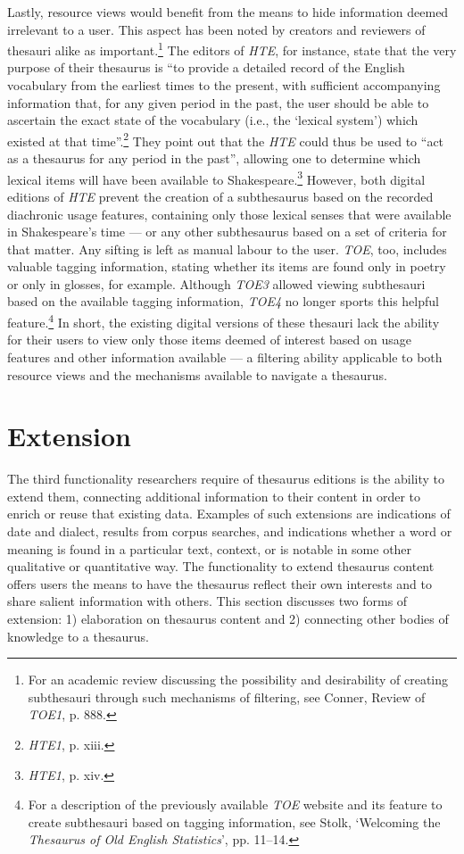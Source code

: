 Lastly, resource views would benefit from the means to hide information deemed irrelevant to a user. This aspect has been noted by creators and reviewers of thesauri alike as important.\footnote{For an academic review discussing the possibility and desirability of creating subthesauri through such mechanisms of filtering, see Conner, Review of \textit{TOE1}, p. 888.} The editors of \textit{HTE}, for instance, state that the very purpose of their thesaurus is ``to provide a detailed record of the English vocabulary from the earliest times to the present, with sufficient accompanying information that, for any given period in the past, the user should be able to ascertain the exact state of the vocabulary (i.e., the `lexical system') which existed at that time''.\footnote{\textit{HTE1}, p. xiii.} They point out that the \textit{HTE} could thus be used to ``act as a thesaurus for any period in the past'', allowing one to determine which lexical items will have been available to Shakespeare.\footnote{\textit{HTE1}, p. xiv.} However, both digital editions of \textit{HTE} prevent the creation of a subthesaurus based on the recorded diachronic usage features, containing only those lexical senses that were available in Shakespeare's time --- or any other subthesaurus based on a set of criteria for that matter. Any sifting is left as manual labour to the user. \textit{TOE}, too, includes valuable tagging information, stating whether its items are found only in poetry or only in glosses, for example. Although \textit{TOE3} allowed viewing subthesauri based on the available tagging information, \textit{TOE4} no longer sports this helpful feature.\footnote{For a description of the previously available \textit{TOE} website and its feature to create subthesauri based on tagging information, see Stolk, `Welcoming the \textit{Thesaurus of Old English Statistics}', pp. 11–14.} In short, the existing digital versions of these thesauri lack the ability for their users to view only those items deemed of interest based on usage features and other information available --- a filtering ability applicable to both resource views and the mechanisms available to navigate a thesaurus.



\section{Extension}
\label{sect:Stolk_thes-functionality:extension}

The third functionality researchers require of thesaurus editions is the ability to extend them, connecting additional information to their content in order to enrich or reuse that existing data. Examples of such extensions are indications of date and dialect, results from corpus searches, and indications whether a word or meaning is found in a particular text, context, or is notable in some other qualitative or quantitative way. The functionality to extend thesaurus content offers users the means to have the thesaurus reflect their own interests and to share salient information with others. This section discusses two forms of extension: 1) elaboration on thesaurus content and 2) connecting other bodies of knowledge to a thesaurus.

